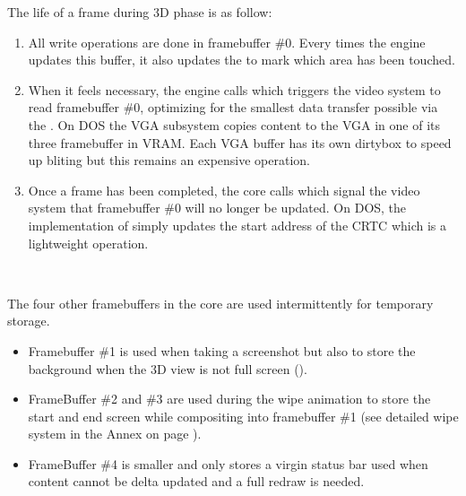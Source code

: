 \pagebreak
\par
The life of a frame during 3D phase is as follow:
\begin{enumerate}
\item All write operations are done in framebuffer \#0. Every times the engine updates this buffer, it also updates the  to mark which area has been touched.
\item When it feels necessary, the engine calls  which triggers the video system to read framebuffer \#0, optimizing for the smallest data transfer possible via the . On DOS the VGA subsystem copies content to the VGA in one of its three framebuffer in VRAM. Each VGA buffer has its own dirtybox  to speed up bliting but this remains an expensive operation.

\item Once a frame has been completed, the core calls   which signal the video system that framebuffer \#0 will no longer be updated. On DOS, the implementation of  simply updates the start address of the CRTC which is a lightweight operation.
\end{enumerate}
\par
{}\\
\par
The four other framebuffers in the core are used intermittently for temporary storage.
\begin{itemize} 
\item Framebuffer \#1 is used when taking a screenshot but also to store the background when the 3D view is not full screen ().

\item FrameBuffer \#2 and \#3 are used during the wipe animation to store the start and end screen while compositing into framebuffer \#1 (see detailed wipe system in the Annex on page \pageref{label_melt}). 
\item FrameBuffer \#4 is smaller and only stores a virgin status bar used when content cannot be delta updated and a full redraw is needed. 
\end{itemize}
\par



